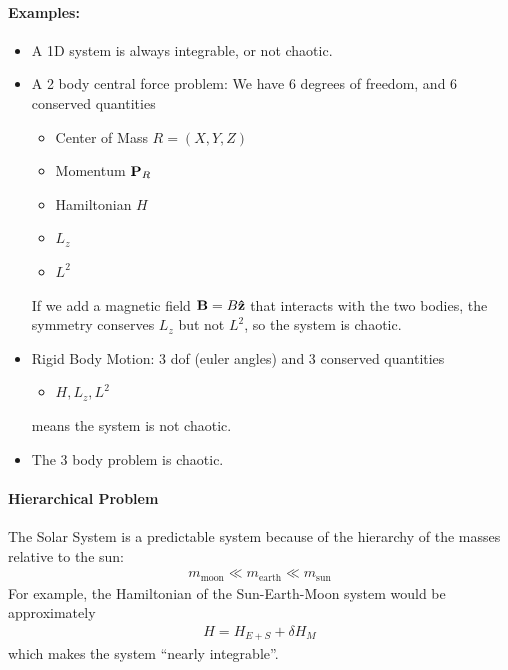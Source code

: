 \documentclass[../main.tex]{subfiles}
\begin{document}
\paragraph*{Examples:}
\begin{itemize}
    \item A 1D system is always integrable, or not chaotic.
    \item A 2 body central force problem: We have 6 degrees of freedom, and 6 conserved quantities
    \begin{itemize}
        \item Center of Mass $R = (X, Y, Z)$
        \item Momentum $\vb P_R$
        \item Hamiltonian $H$
        \item $L_z$
        \item $L^2$
    \end{itemize}
    If we add a magnetic field $\vb B = B \vu z$ that interacts with the two bodies, the symmetry
    conserves $L_z$ but not $L^2$, so the system is chaotic.
    \item Rigid Body Motion: 3 dof (euler angles) and 3 conserved quantities
    \begin{itemize}
        \item $H, L_z, L^2$
    \end{itemize}
    means the system is not chaotic.
    \item The 3 body problem is chaotic.
\end{itemize} 
\paragraph*{Hierarchical Problem}
The Solar System is a predictable system because of the hierarchy of the masses relative to the sun:
\begin{align*}
    m_{\text{moon}} \ll m_{\text{earth}} \ll m_{\text{sun}}
\end{align*}
For example, the Hamiltonian of the Sun-Earth-Moon system would be approximately
\begin{align*}
    H = H_{E + S} + \delta H_{M}
\end{align*}
which makes the system ``nearly integrable''.
\end{document}
